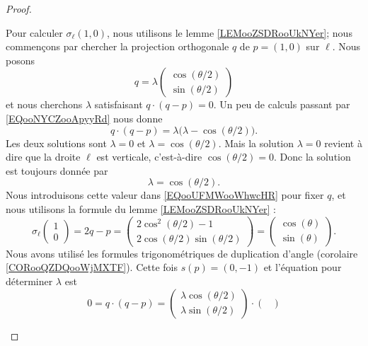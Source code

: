 \begin{proof}
\begin{subproof}
		Pour calculer \( \sigma_{\ell}(1,0)\), nous utilisons le lemme \ref{LEMooZSDRooUkNYer}; nous commençons par chercher la projection orthogonale \( q\) de \( p=(1,0)\) sur \( \ell\). Nous posons
		\begin{equation}        \label{EQooUFMWooWhwcHR}
			q=\lambda\begin{pmatrix}
				\cos(\theta/2) \\
				\sin(\theta/2)
			\end{pmatrix}
		\end{equation}
		et nous cherchons \( \lambda\) satisfaisant \( q\cdot(q-p)=0\). Un peu de calculs passant par \eqref{EQooNYCZooApyyRd} nous donne
		\begin{equation}
			q\cdot (q-p)=\lambda\big( \lambda-\cos(\theta/2) \big).
		\end{equation}
		Les deux solutions sont \( \lambda=0\) et \( \lambda=\cos(\theta/2)\). Mais la solution \( \lambda=0\) revient à dire que la droite \( \ell\) est verticale, c'est-à-dire \( \cos(\theta/2)=0\). Donc la solution est toujours donnée par
		\begin{equation}
			\lambda=\cos(\theta/2).
		\end{equation}
		Nous introduisons cette valeur dans \eqref{EQooUFMWooWhwcHR} pour fixer \( q\), et nous utilisons la formule du lemme \ref{LEMooZSDRooUkNYer} :
		\begin{equation}
			\sigma_{\ell}\begin{pmatrix}
				1 \\
				0
			\end{pmatrix}=2q-p=\begin{pmatrix}
				2\cos^2(\theta/2)-1 \\
				2\cos(\theta/2)\sin(\theta/2)
			\end{pmatrix}
			=\begin{pmatrix}
				\cos(\theta) \\
				\sin(\theta)
			\end{pmatrix}.
		\end{equation}
		Nous avons utilisé les formules trigonométriques de duplication d'angle (corolaire \ref{CORooQZDQooWjMXTF}).
		\spitem[Pour \( p=(0,1)\)]
		Cette fois \( s(p)=(0,-1)\) et l'équation pour déterminer \( \lambda\) est
		\begin{equation}
			0=q\cdot(q-p)=\begin{pmatrix}
				\lambda\cos(\theta/2) \\
				\lambda\sin(\theta/2)
			\end{pmatrix}\cdot\begin{pmatrix}

\end{pmatrix}
\end{equation}
\end{subproof}
\end{proof}
